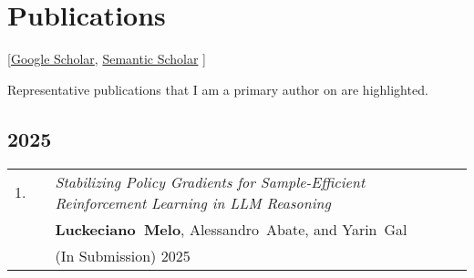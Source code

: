 \documentclass[11pt,letter,sans,colorlinks,linkcolor=true]{moderncv}
\begin{document}
\section{Publications}
\vspace{-8.2mm}\hspace{30mm}
[\href{https://scholar.google.com/citations?user=b2aBi8UAAAAJ}{Google Scholar},
\href{https://www.semanticscholar.org/author/152671543}{Semantic Scholar}
]\vspace{3mm}


Representative publications that I am a primary author on are
\colorbox{tab_highlight}{highlighted.}




\subsection{2025}

\begin{minipage}{\textwidth}
\begin{tabular}{R{8mm}p{1mm}L{6.5in}}
 1.\hspace*{1mm} && \textit{Stabilizing Policy Gradients for Sample-Efficient Reinforcement Learning in LLM Reasoning}  \\
 && \mbox{\textbf{Luckeciano Melo}}, \mbox{Alessandro Abate}, and \mbox{Yarin Gal} \\
 && (In Submission) 2025  \\
\end{tabular} \\[2mm]
\end{minipage}
\end{document}
